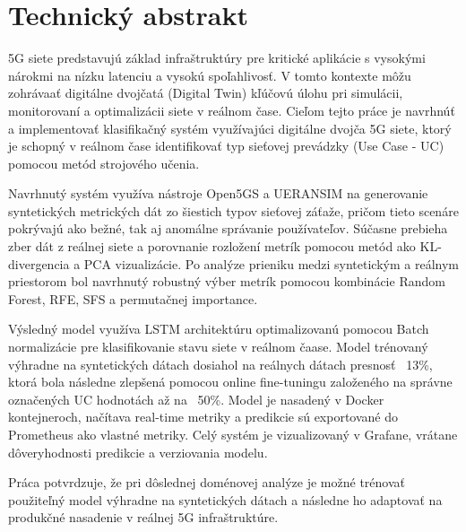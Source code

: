 
\chapter{Technický abstrakt}

5G siete predstavujú základ infraštruktúry pre kritické aplikácie s vysokými nárokmi na nízku latenciu a vysokú spoľahlivosť. V tomto kontexte môžu zohrávaať digitálne dvojčatá (Digital Twin) kľúčovú úlohu pri simulácii, monitorovaní a optimalizácii siete v reálnom čase. Cieľom tejto práce je navrhnúť a implementovať klasifikačný systém využívajúci digitálne dvojča 5G siete, ktorý je schopný v reálnom čase identifikovať typ sieťovej prevádzky (Use Case - UC) pomocou metód strojového učenia.

Navrhnutý systém využíva nástroje Open5GS a UERANSIM na generovanie syntetických metrických dát zo šiestich typov sieťovej záťaže, pričom tieto scenáre pokrývajú ako bežné, tak aj anomálne správanie používateľov. Súčasne prebieha zber dát z reálnej siete a porovnanie rozložení metrík pomocou metód ako KL-divergencia a PCA vizualizácie. Po analýze prieniku medzi syntetickým a reálnym priestorom bol navrhnutý robustný výber metrík pomocou kombinácie Random Forest, RFE, SFS a permutačnej importance.

Výsledný model využíva LSTM architektúru optimalizovanú pomocou Batch normalizácie pre klasifikovanie stavu siete v reálnom čaase. Model trénovaný výhradne na syntetických dátach dosiahol na reálnych dátach presnosť ~13\%, ktorá bola následne zlepšená pomocou online fine-tuningu založeného na správne označených UC hodnotách až na ~50\%. Model je nasadený v Docker kontejneroch, načítava real-time metriky a predikcie sú exportované do Prometheus ako vlastné metriky. Celý systém je vizualizovaný v Grafane, vrátane dôveryhodnosti predikcie a verziovania modelu. 

Práca potvrdzuje, že pri dôslednej doménovej analýze je možné trénovať použiteľný model výhradne na syntetických dátach a následne ho adaptovať na produkčné nasadenie v reálnej 5G infraštruktúre.
